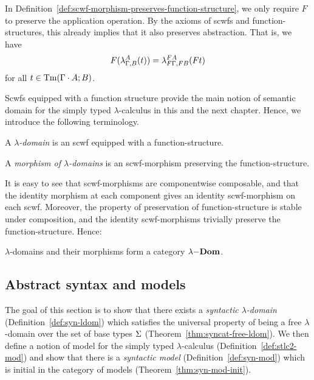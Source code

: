 In Definition~\ref{def:scwf-morphism-preserves-function-structure}, we only require $F$ to preserve the application operation. By the axioms of scwfs and function-structures, this already implies that it also preserves abstraction. That is, we have
\[ F(\Slam{A}[\Gamma,B]{t}) = \Slam{FA}[F\Gamma,FB]{Ft} \]
for all $t \in \STm[\Sextcon{\Gamma}{A}]{B}$.

Scwfs equipped with a function structure provide the main notion of semantic domain for the simply typed $\lambda$-calculus in this and the next chapter. Hence, we introduce the following terminology.

\begin{defn} \label{def:lambda-domain}
\begin{enum}
    \item A \emph{$\lambda$-domain} is an scwf equipped with a function-structure.
    \item A \emph{morphism of $\lambda$-domains} is an scwf-morphism preserving the function-structure.
\end{enum}
\end{defn}

It is easy to see that scwf-morphisms are componentwise composable, and that the identity morphism at each component gives an identity scwf-morphism on each scwf. Moreover, the property of preservation of function-structure is stable under composition, and the identity scwf-morphisms trivially preserve the function-structure. Hence:

\begin{defn} \label{def:cat-lambda-domain}
$\lambda$-domains and their morphisms form a category $\lambda\mathrm{-}\mathbf{Dom}$.
\end{defn}

\subsection{Abstract syntax and models}

The goal of this section is to show that there exists a \textit{syntactic $\lambda$-domain} (Definition~\ref{def:syn-ldom}) which satisfies the universal property of being a free $\lambda$-domain over the set of base types $\Sigma$ (Theorem~\ref{thm:syncat-free-ldom}). We then define a notion of model for the simply typed $\lambda$-calculus (Definition~\ref{def:stlc2-mod}) and show that there is a \textit{syntactic model} (Definition~\ref{def:syn-mod}) which is initial in the category of models (Theorem~\ref{thm:syn-mod-init}).

